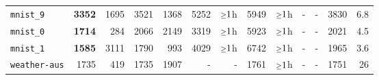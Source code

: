 \begin{tabular}{lrrrrrrrrrrrr}
\texttt{mnist\_9} & \textbf{3352} & 1695 & 3521 & 1368 & 5252 & $\mathsmaller{\geq}1$h & 5949 & $\mathsmaller{\geq}1$h & - & - & 3830 & 6.8\\
\texttt{mnist\_0} & \textbf{1714} & 284 & 2066 & 2149 & 3319 & $\mathsmaller{\geq}1$h & 5923 & $\mathsmaller{\geq}1$h & - & - & 2021 & 4.5\\
\texttt{mnist\_1} & \textbf{1585} & 3111 & 1790 & 993 & 4029 & $\mathsmaller{\geq}1$h & 6742 & $\mathsmaller{\geq}1$h & - & - & 1965 & 3.6\\
\texttt{weather-aus} & 1735 & 419 & 1735 & 1907 & - & - & 1761 & $\mathsmaller{\geq}1$h & - & - & 1751 & 26\\
\bottomrule
\end{tabular}
